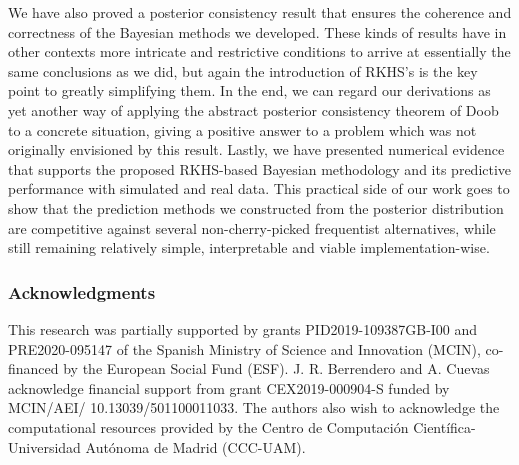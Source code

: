 \documentclass{article}
\numberwithin{equation}{section}
\theoremstyle{plain}
\begin{document}
We have also proved a posterior consistency result that ensures the coherence and correctness of the Bayesian methods we developed. These kinds of results have in other contexts more intricate and restrictive conditions to arrive at essentially the same conclusions as we did, but again the introduction of RKHS's is the key point to greatly simplifying them. In the end, we can regard our derivations as yet another way of applying the abstract posterior consistency theorem of Doob to a concrete situation, giving a positive answer to a problem which was not originally envisioned by this result. Lastly, we have presented numerical evidence that supports the proposed RKHS-based Bayesian methodology and its predictive performance with simulated and real data. This practical side of our work goes to show that the prediction methods we constructed from the posterior distribution are competitive against several non-cherry-picked frequentist alternatives, while still remaining relatively simple, interpretable and viable implementation-wise.




{\footnotesize
\subsubsection*{Acknowledgments}
  This research was partially supported by grants PID2019-109387GB-I00 and PRE2020-095147 of the Spanish Ministry of Science and Innovation (MCIN), co-financed by the European Social Fund (ESF). J. R. Berrendero and A. Cuevas acknowledge financial support from grant CEX2019-000904-S funded by MCIN/AEI/ 10.13039/501100011033. The authors also wish to acknowledge the computational resources provided by the Centro de Computación Científica-Universidad Autónoma de Madrid (CCC-UAM).
}









\newpage
\appendix

\end{document}
